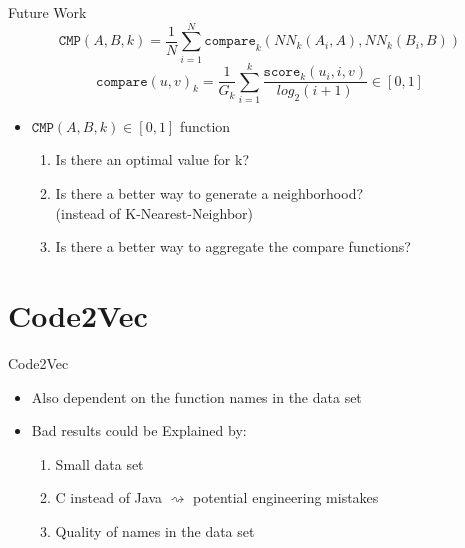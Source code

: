 \documentclass[aspectratio=1610,12pt]{beamer}
\begin{document}
\begin{frame}{Future Work}
    \[
    \texttt{CMP}(A,B,k) = \frac{1}{N}\sum_{i = 1}^{N}
      \texttt{compare}_k(NN_k(A_i,A),NN_k(B_i, B))
    \]
    \[
    \texttt{compare}(u,v)_k = 
      \frac{1}{G_k} \sum^{k}_{i=1} 
      \frac{ \texttt{score}_{k}(u_i,i,v)}{log_2(i+1)} 
      \in [0,1]
    \]
  \begin{itemize}
  \item $\texttt{CMP}(A,B,k) \in [0,1] $ function
    \begin{enumerate}
      \item Is there an optimal value for k?
      \item Is there a better way to generate a neighborhood?\\
        (instead of K-Nearest-Neighbor)
      \item Is there a better way to aggregate the compare functions?
    \end{enumerate}
  \end{itemize}
\end{frame}
\section{Code2Vec}
\begin{frame}{Code2Vec}
  \begin{itemize}
    \item Also dependent on the function names in the data set
    \item Bad results could be Explained by:
      \begin{enumerate}
        \item Small data set
        \item C instead of Java $\rightsquigarrow$ potential engineering mistakes
        \item Quality of names in the data set
      \end{enumerate}
  \end{itemize}
\end{frame}
\end{document}
